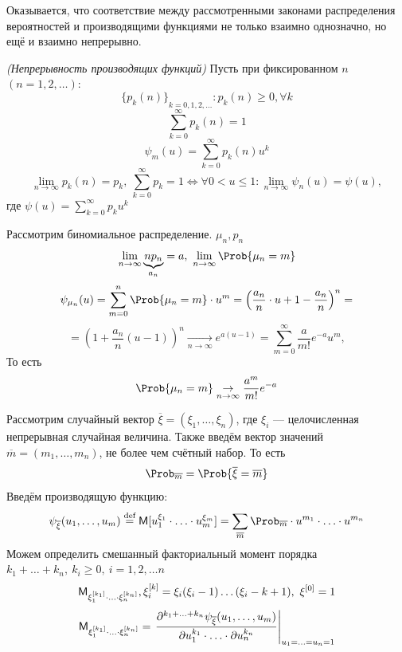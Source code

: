 Оказывается, что соответствие между рассмотренными законами распределения вероятностей и производящими функциями не только взаимно однозначно, но ещё и взаимно непрерывно.
\begin{theorem} \textit{(Непрерывность производящих функций)} 
	Пусть при фиксированном $n$ $(n = 1, 2, \ldots)$:
	\[
		{\{ p_k (n) \}}_{k = 0, 1, 2, \ldots} : p_k (n) \geqslant 0, \forall k
	\]
	\[
		\sum\limits_{k = 0}^{\infty} p_k (n) = 1
	\]
	\[
		\psi_m (u) = \sum\limits_{k = 0}^{\infty} p_k (n) u^k
	\]
	\[
		\lim\limits_{n \to \infty} p_k (n) = p_k, \ \sum\limits_{k = 0}^{\infty} p_k = 1 \Leftrightarrow \forall 0 < u \leqslant 1: \lim\limits_{n \to \infty} \psi_n (u) = \psi (u),
	\]
	где $\psi (u) = \sum\limits_{k = 0}^{\infty} p_k u^k$
\end{theorem}
\begin{example}
	Рассмотрим биномиальное распределение. $\mu_n, p_n$
	\[
		\lim\limits_{n \to \infty} \underbrace{n p_n}_{a_n} = a, \ \lim\limits_{n \to \infty} \Prob \{ \mu_n = m \}
	\]
	\[
		\psi_{\mu_n} (u) = \sum\limits_{m = 0}^{n} \Prob \{ \mu_n = m \} \cdot u^m = \left( \frac{a_n}{n} \cdot u + 1 - \frac{a_n}{n} \right)^n =
	\]
	\[
		= \left( 1 + \frac{a_n}{n} (u - 1) \right)^n \underset{n \to \infty}{\rightarrow} e^{a(u - 1)} = \sum\limits_{m = 0}^{\infty} \frac{a}{m!} e^{-a} u^m,
	\]
	То есть
	\[
		\Prob \{ \mu_n = m \} \underset{n \to \infty}{\rightarrow} \frac{a^m}{m!} e^{-a}
	\]
\end{example}
Рассмотрим случайный вектор $\overline{\xi} = (\xi_1, \ldots, \xi_n)$, где $\xi_i$ --- целочисленная непрерывная случайная величина. Также введём вектор значений $\overline{m} = (m_1, \ldots, m_n)$, не более чем счётный набор. То есть
\[
	\Prob_{\overline{m}} = \Prob \{ \overline{\xi} = \overline{m} \}
\]
Введём производящую функцию:
\[
	\psi_{\overline{\xi}} (u_1, \ldots, u_m) \overset{\textrm{def}}{=} \MExpect [u_1^{\xi_1} \cdot \ldots \cdot u_m^{\xi_m}] = \sum\limits_{\overline{m}} \Prob_{\overline{m}} \cdot u^{m_1} \cdot \ldots \cdot u^{m_n}
\]
Можем определить смешанный факториальный момент порядка $k_1 + \ldots + k_n, \ k_i \geqslant 0, \ i = 1, 2, \ldots n$
\[
	\mathsf{M}_{\xi_1^{[k_1]} \cdot \ldots \cdot \xi_n^{[k_n]}}, \xi_i^{[k]} = \xi_i (\xi_i - 1) \ldots (\xi_i - k + 1), \ \xi^{[0]} = 1
\]
\[
	\mathsf{M}_{\xi_1^{[k_1]} \cdot \ldots \cdot \xi_n^{[k_n]}} = 
\left. \frac{ \partial^{k_1 + \ldots + k_n} \psi_{\overline{\xi}} (u_1, \ldots, u_m) }{ \partial u_1^{k_1} \cdot \ldots \cdot \partial u_n^{k_n} } \right|_{u_1 = \ldots = u_n = 1}
\]

